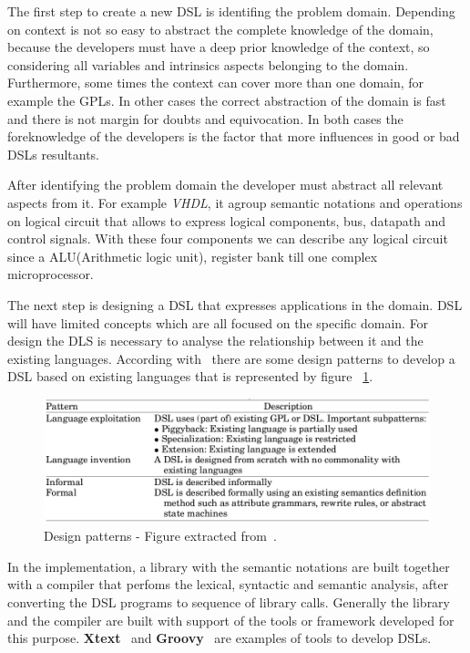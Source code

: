 The first step to create a new DSL is identifing the problem domain. Depending on
context is not so easy to abstract the complete knowledge of the domain, because
the developers must have a deep prior knowledge of the context, so considering all
variables and intrinsics aspects belonging to the domain. Furthermore, some times
the context can cover more than one domain, for example the GPLs. In other cases
the correct abstraction of the domain is fast and there is not margin for doubts
and equivocation. In both cases the foreknowledge of the developers is the factor
that more influences in good or bad DSLs resultants.

After identifying the problem domain the developer must abstract all relevant 
aspects from it. For example {\it VHDL}, it agroup semantic notations and operations
on logical circuit that allows to express logical components, bus, datapath and
control signals. With these four components we can describe any logical circuit
since a ALU(Arithmetic logic unit), register bank till one complex microprocessor. 

The next step is designing a DSL that expresses applications in the domain. DSL
will have limited concepts which are all focused on the specific domain. For
design the DLS is necessary to analyse the relationship between it and the existing
languages. According with~\cite{mernik:2005} there are some design patterns to
develop a DSL based on existing languages that is represented by figure ~\ref{fig:patterns}.

\begin{figure}[htbp]
        \centering
        \includegraphics[width=\columnwidth]{img/designPatterns.png}
        \caption{Design patterns - Figure extracted from~\cite{mernik:2005}.}\label{fig:patterns}
\end{figure}

In the implementation, a library with the semantic notations are built
together with a compiler that perfoms the lexical, syntactic and semantic analysis, 
after converting the DSL programs to sequence of library calls. Generally the library
and the compiler are built with support of the tools or framework developed
for this purpose. \textbf{Xtext}~\cite{xtext} and \textbf{Groovy}~\cite{groovyDSL, groovyDSLBook}
are examples of tools to develop DSLs.

